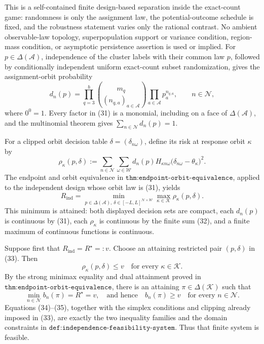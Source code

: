 This is a self-contained finite design-based separation inside the exact-count game: randomness is only the assignment law, the potential-outcome schedule is fixed, and the robustness statement varies only the rational contrast.  No ambient observable-law topology, superpopulation support or variance condition, region-mass condition, or asymptotic persistence assertion is used or implied.
For \(p\in\Delta(\mathcal A)\), independence of the cluster labels with their common law \(p\), followed by conditionally independent uniform exact-count subset randomization, gives the assignment-orbit probability
\[
d_n(p)=\prod_{q=3}^{b}
 \binom{m_q}{(n_{q,a})_{a\in\mathcal A}}
 \prod_{a\in\mathcal A}p_a^{n_{q,a}},
\qquad n\in\mathcal N,                                                     \tag{31}
\]
where \(0^0=1\).  Every factor in (31) is a monomial, including on a face of \(\Delta(\mathcal A)\), and the multinomial theorem gives \(\sum_{n\in\mathcal N}d_n(p)=1\).

For a clipped orbit decision table \(\delta=(\delta_{n\omega})\), define its risk at response orbit \(\kappa\) by
\[
 \rho_\kappa(p,\delta)
 :=\sum_{n\in\mathcal N}\sum_{\omega\in\mathcal W}
 d_n(p)H_{\kappa n\omega}
 \bigl(\delta_{n\omega}-\theta_\kappa\bigr)^2.                            \tag{32}
\]
The endpoint and orbit equivalence in \(\texttt{thm:endpoint-orbit-equivalence}\), applied to the independent design whose orbit law is (31), yields
\[
 R_{\mathrm{ind}}
 =\min_{p\in\Delta(\mathcal A),\,
              \delta\in[-L,L]^{\mathcal N\times\mathcal W}}
       \max_{\kappa\in\mathcal K}\rho_\kappa(p,\delta).                 \tag{33}
\]
This minimum is attained: both displayed decision sets are compact, each \(d_n(p)\) is continuous by (31), each \(\rho_\kappa\) is continuous by the finite sum (32), and a finite maximum of continuous functions is continuous.

Suppose first that \(R_{\mathrm{ind}}=R^\star=:v\).  Choose an attaining restricted pair \((p,\delta)\) in (33).  Then
\[
 \rho_\kappa(p,\delta)\le v
 \quad\text{for every }\kappa\in\mathcal K.                               \tag{34}
\]
By the strong minimax equality and dual attainment proved in \(\texttt{thm:endpoint-orbit-equivalence}\), there is an attaining \(\pi\in\Delta(\mathcal K)\) such that
\[
 \min_{n\in\mathcal N}b_n(\pi)=R^\star=v,
 \quad\text{and hence}\quad
 b_n(\pi)\ge v\quad\text{for every }n\in\mathcal N.                     \tag{35}
\]
Equations (34)--(35), together with the simplex conditions and clipping already imposed in (33), are exactly the two inequality families and the domain constraints in \(\texttt{def:independence-feasibility-system}\).  Thus that finite system is feasible.

